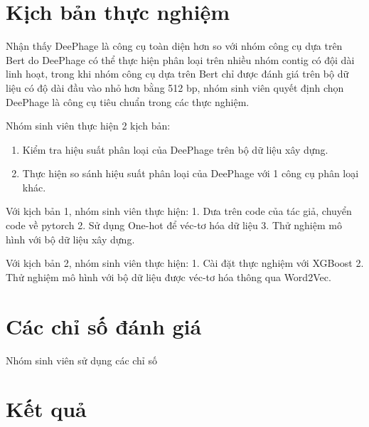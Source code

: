 \section{Kịch bản thực nghiệm}\label{ kịch bản thực nghiệm}
Nhận thấy DeePhage là công cụ toàn diện hơn so với nhóm công cụ dựa trên Bert do DeePhage có thể thực hiện phân loại trên nhiều nhóm contig có đội dài linh hoạt, trong khi nhóm công cụ dựa trên Bert chỉ được đánh giá trên bộ dữ liệu có độ dài đầu vào nhỏ hơn bằng 512 bp, nhóm sinh viên quyết định chọn DeePhage là công cụ tiêu chuẩn trong các thực nghiệm.

Nhóm sinh viên thực hiện 2 kịch bản:
\begin{enumerate}
    \item Kiểm tra hiệu suất phân loại của DeePhage trên bộ dữ liệu xây dựng.
    \item Thực hiện so sánh hiệu suất phân loại của DeePhage với 1 công cụ phân loại khác.
\end{enumerate}

Với kịch bản 1, nhóm sinh viên thực hiện:
1. Dưa trên code của tác giả, chuyển code về pytorch
2. Sử dụng One-hot để véc-tơ hóa dữ liệu
3. Thử nghiệm mô hình với bộ dữ liệu xây dựng.

Với kịch bản 2, nhóm sinh viên thực hiện:
1. Cài đặt thực nghiệm với XGBoost 
2. Thử nghiệm mô hình với bộ dữ liệu được véc-tơ hóa thông qua Word2Vec.

\section{Các chỉ số đánh giá}
Nhóm sinh viên sử dụng các chỉ số 

\section{Kết quả}
